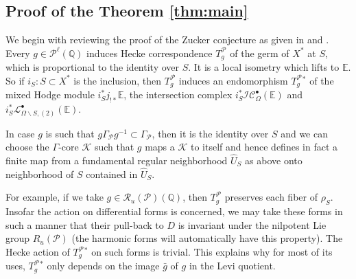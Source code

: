 \documentclass[12pt,letterpaper]{amsart}
\numberwithin{equation}{section}
\def\EE{{\mathbb E}}
\def\QQ{{\mathbb Q}}
\def\ssm{\smallsetminus}
\def\G{\Gamma}
\def\Iscr{{\mathscr I}}
\def\Kcal{{\mathcal K}}
\def\Lscr{{\mathscr L}}
\def\Pcal{{\mathcal P}}
\def\Rcal{{\mathcal R}}
\def\Cscr{{\mathscr C}}
\def\pt{{\scriptscriptstyle\bullet}}
\theoremstyle{remark}
\begin{document}
\subsection{Proof of the Theorem \ref{thm:main}}
We begin with reviewing the proof of the Zucker conjecture as given in \cite{looij:l2} and \cite{lr}.
Every $g\in \Pcal^\ell(\QQ)$ induces  Hecke correspondence $T^\Pcal_g$ of the germ of $X^*$ at $S$, which is proportional to the identity over $S$. It is a local isometry which lifts to $\EE$. So if  $i_S: S\subset  X^*$ is the inclusion, then $T^\Pcal_g$
induces an endomorphism $T^\Pcal_g{}^*$ of the mixed Hodge module $i_S^*j_{!*}\EE$, the intersection complex $ i_S^*\Iscr\Cscr_{\Omega}^\pt(\EE)$ and  $i_S^*\Lscr^\pt_{\Omega \ssm S,(2)}(\EE)$.

In case  $g$ is such that  $g\G_\Pcal g^{-1}\subset\G_\Pcal$, then it is the identity over $S$ and we can choose the $\G$-core $\Kcal$ such that  $g$ maps a $\Kcal$ to itself and hence defines in fact a finite map from a fundamental regular neighborhood $\hat U_S$ as above onto neighborhood of $S$ contained in $\hat U_S$. 

For  example, if we take $g\in \Rcal_u(\Pcal)(\QQ)$, then $T^\Pcal_g$  preserves each  fiber of $\rho_S$. Insofar the action 
on  differential forms  is concerned, we may take these forms in such a manner that their pull-back to 
$D$ is invariant under the nilpotent  Lie group $R_u(\Pcal)$ (the harmonic forms will automatically have this property). 
The  Hecke action of $T^\Pcal_g{}^*$ on such forms is trivial. This explains  why  for most of its uses, $T^\Pcal_g{}^*$ 
only depends on the image $\bar g$ of $g$ in the Levi quotient. 
\end{document}
